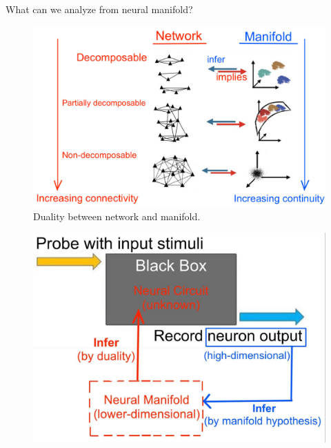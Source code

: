 \documentclass[xcolor={dvipsnames,svgnames}]{beamer}
\begin{document}
\begin{frame}{What can we analyze from neural manifold?}
    \begin{minipage}[b][][b]{.65\linewidth}  
\begin{figure}
    \includegraphics[width=\textwidth]{figures/intro/networks-manifolds.jpg}
    \caption{Duality between network and manifold.}
\end{figure} 
\end{minipage}
\begin{minipage}[b][][b]{.33\linewidth}   
\begin{figure}         \includegraphics[width=\textwidth]{figures/intro/black-box-2.jpg}
\end{figure} 
\end{minipage}

\end{frame}
\end{document}
